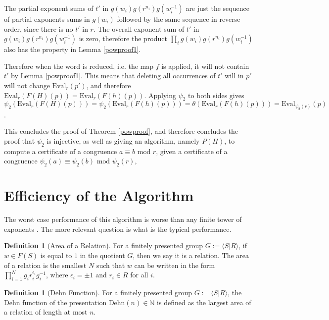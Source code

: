 \documentclass[12pt]{article} %
\theoremstyle{definition}
\theoremstyle{definition}
\theoremstyle{definition}
\theoremstyle{definition}
\newtheorem{defn}[thm]{Definition}
\begin{document}
The partial exponent sums of $t'$ in $g(w_i)g(r^{n_i})g(w_i^{-1})$ are just
the sequence of partial exponents sums in $g(w_i)$ followed by the same sequence in reverse
order, since there is no $t'$ in $r$. The overall exponent sum
of $t'$ in $g(w_i)g(r^{n_i})g(w_i^{-1})$ is zero, therefore the product
$\prod_i g(w_i)g(r^{n_i})g(w_i^{-1})$ also has the property in Lemma \ref{powproof1}.

Therefore when the word is reduced, i.e. the map $f$ is applied,
it will not contain $t'$ by Lemma \ref{powproof1}. This means that deleting all occurrences of
$t'$ will in $p'$ will not change $\text{Eval}_r(p')$, and therefore
$\text{Eval}_r(F(H)(p)) = \text{Eval}_r(F(h)(p))$.
Applying $\psi_2$ to both sides gives
$\psi_2(\text{Eval}_r(F(H)(p))) =
  \psi_2(\text{Eval}_r(F(h)(p))) =
  \theta(\text{Eval}_r(F(h)(p))) =
  \text{Eval}_{\psi_2(r)}(p)$.

  This concludes the proof of Theorem \ref{powproof}, and therefore concludes the proof
  that $\psi_2$ is injective, as well as giving an algorithm, namely $P(H)$,
  to compute a certificate of a congruence $a \equiv b \text{ mod } r$,
  given a certificate of a congruence  $\psi_2(a) \equiv \psi_2(b) \text{ mod } \psi_2(r)$,

\section{Efficiency of the Algorithm}

  The worst case performance of this algorithm is worse than any finite tower of exponents
  \cite{MYASNIKOV2011324}. The more relevant question is what is the typical performance.

  \begin{defn}[Area of a Relation]
  For a finitely presented group $G := \langle S | R\rangle$, if $w \in F(S)$ is equal
  to $1$ in the quotient $G$, then we say it is a relation.
  The area of a relation is the smallest $N$ such that $w$ can be written
  in the form $\prod_{i=1}^N g_i r_i^{\epsilon_i} g_i^{-1}$, where $\epsilon_i = \pm 1$
  and $r_i \in R$ for all $i$.
  \end{defn}

  \begin{defn}[Dehn Function]
  For a finitely presented group $G := \langle S | R\rangle$, the Dehn function
  of the presentation $\text{Dehn}(n) \in \mathbb{N}$ is defined as the
  largest area of a relation of length at most $n$.
  \end{defn}
\end{document}
